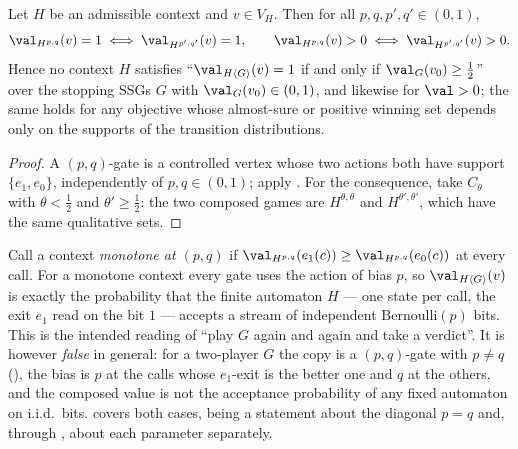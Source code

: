 \begin{theorem}\label{thm:fs16-noqual}
Let $H$ be an admissible context and $v\in V_H$. Then for all
$p,q,p',q'\in(0,1)$,
\[
  \val_{H^{p,q}}(v)=1\iff\val_{H^{p',q'}}(v)=1,
  \qquad
  \val_{H^{p,q}}(v)>0\iff\val_{H^{p',q'}}(v)>0 .
\]
Hence no context $H$ satisfies ``$\val_{H\langle G\rangle}(v)=1$ if and only if
$\val_G(v_0)\ge\tfrac12$'' over the stopping SSGs $G$ with
$\val_G(v_0)\in(0,1)$, and likewise for $\val>0$; the same holds for any
objective whose almost-sure or positive winning set depends only on the
supports of the transition distributions.
\end{theorem}

\begin{proof}
A $(p,q)$-gate is a controlled vertex whose two actions both have support
$\{e_1,e_0\}$, independently of $p,q\in(0,1)$; apply
. For the consequence, take $C_\theta$ with
$\theta<\tfrac12$ and $\theta'\ge\tfrac12$: the two composed games are
$H^{\theta,\theta}$ and $H^{\theta',\theta'}$, which have the same qualitative
sets.
\end{proof}

\begin{remark}\label{rem:fs16-iid}
Call a context \emph{monotone at $(p,q)$} if $\val_{H^{p,q}}(e_1(c))\ge
\val_{H^{p,q}}(e_0(c))$ at every call. For a monotone context every gate uses
the action of bias $p$, so $\val_{H\langle G\rangle}(v)$ is exactly the
probability that the finite automaton $H$ --- one state per call, the exit
$e_1$ read on the bit $1$ --- accepts a stream of independent
$\mathrm{Bernoulli}(p)$ bits. This is the intended reading of ``play $G$ again
and again and take a verdict''. It is however \emph{false} in general: for a
two-player $G$ the copy is a $(p,q)$-gate with $p\ne q$
(), the bias is $p$ at the calls whose $e_1$-exit is the
better one and $q$ at the others, and the composed value is not the acceptance
probability of any fixed automaton on i.i.d.\ bits. 
covers both cases, being a statement about the diagonal $p=q$ and, through
, about each parameter separately.
\end{remark}

